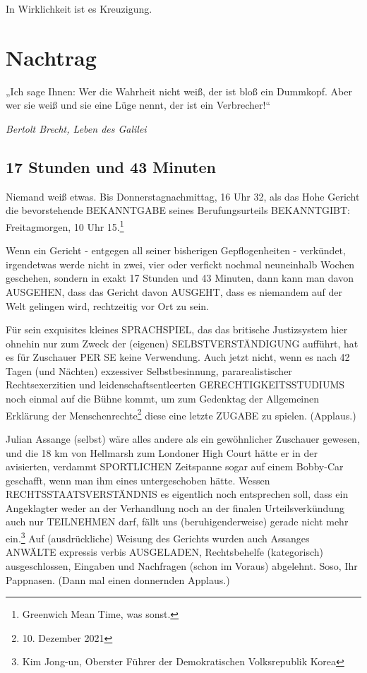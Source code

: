 \begin{multicols}{2}
In Wirklichkeit ist es Kreuzigung.



\chapter{Nachtrag}

\epigraph{„Ich sage Ihnen: Wer die Wahrheit nicht weiß, der ist bloß ein Dummkopf. Aber wer sie weiß und sie eine Lüge nennt, der ist ein Verbrecher!“}{\textit{Bertolt Brecht, Leben des Galilei}}


\section{17 Stunden und 43 Minuten}

Niemand weiß etwas. Bis Donnerstagnachmittag, 16 Uhr
32, als das Hohe Gericht die bevorstehende BEKANNTGABE seines Berufungsurteils BEKANNTGIBT: Freitagmorgen, 10 Uhr 15.\footnote[25]{Greenwich Mean Time, was sonst.}

Wenn ein Gericht - entgegen all seiner bisherigen Gepflogenheiten - verkündet, irgendetwas werde nicht in
zwei, vier oder verfickt nochmal neuneinhalb Wochen
geschehen, sondern in exakt 17 Stunden und 43 Minuten, dann kann man davon AUSGEHEN, dass das Gericht davon AUSGEHT, dass es niemandem auf der Welt
gelingen wird, rechtzeitig vor Ort zu sein.

Für sein exquisites kleines SPRACHSPIEL, das das britische Justizsystem hier ohnehin nur zum Zweck der
(eigenen) SELBSTVERSTÄNDIGUNG aufführt, hat es für
Zuschauer PER SE keine Verwendung. Auch jetzt nicht,
wenn es nach 42 Tagen (und Nächten) exzessiver Selbstbesinnung, pararealistischer Rechtsexerzitien und leidenschaftsentleerten
GERECHTIGKEITSSTUDIUMS
noch einmal auf die Bühne kommt, um zum Gedenktag
der Allgemeinen Erklärung der Menschenrechte\footnote[26]{10. Dezember 2021} diese
eine letzte ZUGABE zu spielen. (Applaus.)

Julian Assange (selbst) wäre alles andere als ein gewöhnlicher Zuschauer gewesen, und die 18 km von Hellmarsh
zum Londoner High Court hätte er in der avisierten, verdammt SPORTLICHEN Zeitspanne sogar auf einem Bobby-Car geschafft, wenn man ihm eines untergeschoben
hätte. Wessen RECHTSSTAATSVERSTÄNDNIS es eigentlich noch entsprechen soll, dass ein Angeklagter weder
an der Verhandlung noch an der finalen Urteilsverkündung auch nur TEILNEHMEN darf, fällt uns (beruhigenderweise) gerade nicht mehr ein.\footnote[27]{Kim Jong-un, Oberster Führer der Demokratischen Volksrepublik Korea} Auf (ausdrückliche)
Weisung des Gerichts wurden auch Assanges ANWÄLTE
expressis verbis AUSGELADEN, Rechtsbehelfe (kategorisch) ausgeschlossen, Eingaben und Nachfragen (schon
im Voraus) abgelehnt. Soso, Ihr Pappnasen. (Dann mal
einen donnernden Applaus.)


\end{multicols}
